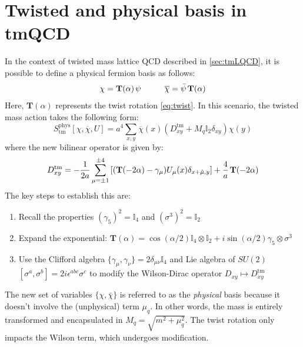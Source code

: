 \documentclass[english, LaM, oneside, noexaminfo]{sapthesis}
\begin{document}
\section{Twisted and physical basis in tmQCD}
\noindent
In the context of twisted mass lattice QCD described in \ref{sec:tmLQCD}, it is possible to define a physical fermion basis as follows:
\begin{equation*}
    \chi = \mathbf{T}(\alpha)\hspace*{0.5mm} \psi \hspace*{1cm} \overline{\chi} = \bar\psi\hspace*{0.5mm}\mathbf{T}(\alpha)
\end{equation*}
Here, $\mathbf{T}(\alpha)$ represents the twist rotation \ref{eq:twist}.
In this scenario, the twisted mass action takes the following form:
\begin{equation}\label{eq:physical-action}
    S^\text{phys}_\text{tm} [\chi,\overline{\chi},U] = a^4 \sum_{x,y} \overline{\chi} (x) \left( D_{xy}^\text{tm} + M_q \mathbb{I}_2 \delta_{xy}\right) \chi (y)
\end{equation}
where the new bilinear operator is given by:
\begin{equation*}
    D^\text{tm}_{xy} = -\frac{1}{2a} \sum_{\mu = \pm 1}^{\pm 4} \left[ (\mathbf{T}(-2\alpha) - \gamma_\mu) U_\mu (x) \delta_{x+\hat\mu,y} \right] +\frac{4}{a} \hspace*{0.5mm} \mathbf{T}(-2\alpha)
\end{equation*}
The key steps to establish this are:
\begin{enumerate}
    \item Recall the properties $(\gamma_5)^2=\mathbb{I}_4$ and $(\sigma^3)^2=\mathbb{I}_2$
    \item Expand the exponential: $\mathbf{T}(\alpha) = \cos(\alpha/2)\mathbb{I}_4\otimes\mathbb{I}_2 + i\sin(\alpha/2)\gamma_5\otimes\sigma^3$
    \item Use the Clifford algebra $\{\gamma_\mu,\gamma_\nu\}= 2\delta_{\mu\nu}\mathbb{I}_4$ and Lie algebra of $SU(2)$ $[\sigma^a,\sigma^b]=2i\epsilon^{abc}\sigma^c$ to modify the Wilson-Dirac operator $D_{xy} \mapsto D_{xy}^\text{tm}$
\end{enumerate}
The new set of variables $\{\chi,\bar\chi\}$ is referred to as the {\it physical} basis because it doesn't involve the (unphysical) term $\mu_q$.
In other words, the mass is entirely transformed and encapsulated in $M_q = \sqrt{m^2+\mu_q^2}$.
The twist rotation only impacts the Wilson term, which undergoes modification. 
\end{document}
